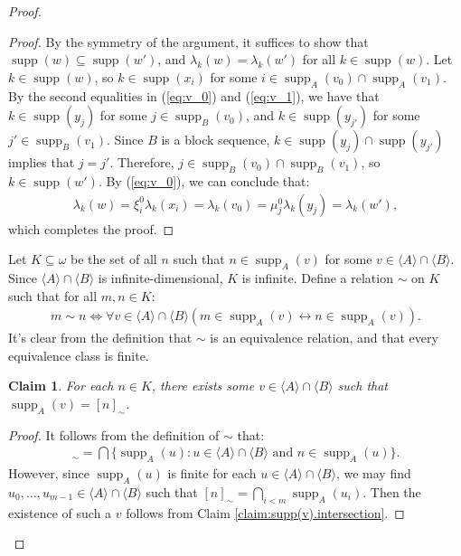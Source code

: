 \documentclass[11pt,reqno]{amsart}
\theoremstyle{plain}
\numberwithin{equation}{section}
\newtheorem{claim}{Claim}
\theoremstyle{definition}
\newcommand{\func}{\operatorname}
\renewcommand{\c}[1]{\langle #1 \rangle}
\newcommand{\supp}{\func{supp}}
\newenvironment{midproof}[1][Proof]
  {\begin{proof}[#1]\renewcommand{\qedsymbol}{$\blacksquare$}}
  {\end{proof}}
\begin{document}
\begin{proof}
\begin{midproof}
        By the symmetry of the argument, it suffices to show that $\supp(w) \subseteq \supp(w')$, and $\lambda_k(w) = \lambda_k(w')$ for all $k \in \supp(w)$. Let $k \in \supp(w)$, so $k \in \supp(x_i)$ for some $i \in \supp_A(v_0) \cap \supp_A(v_1)$. By the second equalities in (\ref{eq:v_0}) and (\ref{eq:v_1}), we have that $k \in \supp(y_j)$ for some $j \in \supp_B(v_0)$, and $k \in \supp(y_{j'})$ for some $j' \in \supp_B(v_1)$. Since $B$ is a block sequence, $k \in \supp(y_j) \cap \supp(y_{j'})$ implies that $j = j'$. Therefore, $j \in \supp_B(v_0) \cap \supp_B(v_1)$, so $k \in \supp(w')$. By (\ref{eq:v_0}), we can conclude that:
        \begin{align*}
            \lambda_k(w) = \xi_i^0\lambda_k(x_i) = \lambda_k(v_0) = \mu_j^0\lambda_k(y_j) = \lambda_k(w'),
        \end{align*}
        which completes the proof. 
    \end{midproof}
    
    Let $K \subseteq \omega$ be the set of all $n$ such that $n \in \supp_A(v)$ for some $v \in \c{A} \cap \c{B}$. Since $\c{A} \cap \c{B}$ is infinite-dimensional, $K$ is infinite. Define a relation $\sim$ on $K$ such that for all $m,n \in K$:
    \begin{align*}
        m \sim n \iff \forall v \in \c{A} \cap \c{B}(m \in \supp_A(v) \leftrightarrow n \in \supp_A(v)).
    \end{align*}
    It's clear from the definition that $\sim$ is an equivalence relation, and that every equivalence class is finite. 

    \begin{claim}
        For each $n \in K$, there exists some $v \in \c{A} \cap \c{B}$ such that $\supp_A(v) = [n]_\sim$. 
    \end{claim}

    \begin{midproof}
        It follows from the definition of $\sim$ that:
        \begin{align*}
            [n]_\sim = \bigcap\{\supp_A(u) : u \in \c{A} \cap \c{B} \text{ and } n \in \supp_A(u)\}.
        \end{align*}
        However, since $\supp_A(u)$ is finite for each $u \in \c{A} \cap \c{B}$, we may find $u_0,\dots,u_{m-1} \in \c{A} \cap \c{B}$ such that $[n]_\sim = \bigcap_{i<m} \supp_A(u_i)$. Then the existence of such a $v$ follows from Claim \ref{claim:supp(v).intersection}.
    \end{midproof}


\end{proof}
\end{document}
